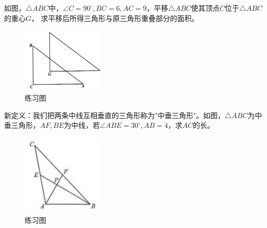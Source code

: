 \documentclass{ecnuthesis}
\begin{document}
\begin{problem}
    如图，$\triangle ABC$中，$\angle C=90^\circ,BC=6,AC=9$，平移$\triangle ABC$使其顶点$C$位于$\triangle ABC$的重心$G$，
    求平移后所得三角形与原三角形重叠部分的面积。
\end{problem}
\begin{figure}[H]
\centering
\includegraphics[width=4cm]{picture/824.png}
\caption{练习图}
\end{figure}
\begin{problem}
    新定义：我们把两条中线互相垂直的三角形称为"中垂三角形"。如图，$\triangle ABC$为中垂三角形，$AF,BE$为中线，若$\angle ABE=30^\circ,AB=4$，求$AC$的长。
\end{problem}
\begin{figure}[H]
\centering
\includegraphics[width=4cm]{picture/823.png}
\caption{练习图}
\end{figure}
\clearpage
\end{document}
